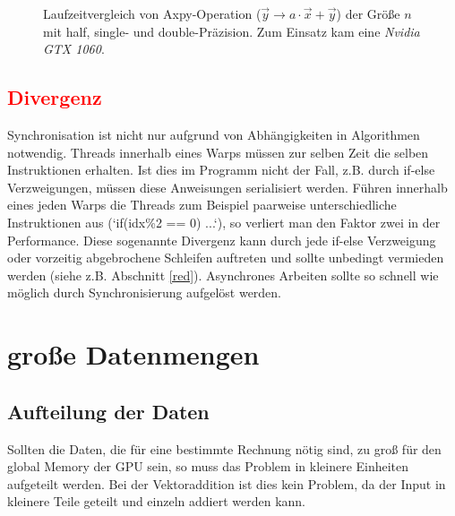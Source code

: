 		\begin{figure}[h]
  		\centering
  		\caption[Axpy mit verschiedenen Präzisionen]{Laufzeitvergleich von Axpy-Operation ($\vec{y}\rightarrow a\cdot\vec{x}+\vec{y}$) der Größe $n$ mit half, single- und double-Präzision. Zum Einsatz kam eine \textit{Nvidia GTX 1060}.}
  		\label{fig3:axpy}
		\end{figure}
		
		
		\subsection*{\textcolor{red}{Divergenz}}
		Synchronisation ist nicht nur aufgrund von Abhängigkeiten in Algorithmen notwendig. \Glspl{Thread} innerhalb eines \Glspl{Warp} müssen zur selben Zeit die selben Instruktionen erhalten. Ist dies im Programm nicht der Fall, z.B. durch if-else Verzweigungen, müssen diese Anweisungen serialisiert werden. Führen innerhalb eines jeden \Glspl{Warp} die \Glspl{Thread} zum Beispiel paarweise unterschiedliche Instruktionen aus (\li`if(idx\%2 == 0) ...`), so verliert man den Faktor zwei in der \Gls{Performance}. Diese sogenannte Divergenz kann durch jede if-else Verzweigung oder vorzeitig abgebrochene Schleifen auftreten und sollte unbedingt vermieden werden (siehe z.B. Abschnitt \ref{red}). Asynchrones Arbeiten sollte so schnell wie möglich durch Synchronisierung aufgelöst werden. 
		
		\section{gro\ss e Datenmengen}\label{data}
		\subsection*{Aufteilung der Daten}
		Sollten die Daten, die für eine bestimmte Rechnung nötig sind, zu groß für den \Gls{global Memory} der GPU sein, so muss das Problem in kleinere Einheiten aufgeteilt werden. Bei der Vektoraddition ist dies kein Problem, da der Input in kleinere Teile geteilt und einzeln addiert werden kann. 
		
